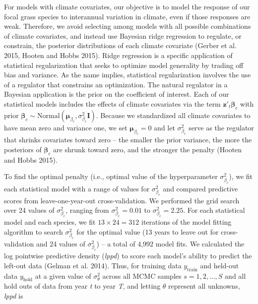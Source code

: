\documentclass[12pt,]{article}
\begin{document}
For models with climate covariates, our objective is to model the
response of our focal grass species to interannual variation in climate,
even if those responses are weak. Therefore, we avoid selecting among
models with all possible combinations of climate covariates, and instead
use Bayesian ridge regression to regulate, or constrain, the posterior
distributions of each climate covariate (Gerber et al. 2015, Hooten and
Hobbs 2015). Ridge regression is a specific application of statistical
regularization that seeks to optimize model generality by trading off
bias and variance. As the name implies, statistical regularization
involves the use of a regulator that constrains an optimization. The
natural regulator in a Bayesian application is the prior on the
coefficient of interest. Each of our statistical models includes the
effects of climate covariates via the term
\(\textbf{z}'_t \boldsymbol{\beta}_c\) with prior
\(\boldsymbol{\beta}_c \sim \text{Normal}(\boldsymbol{\mu}_{\beta_c}, \sigma_{\beta_c}^2\textbf{I})\).
Because we standardized all climate covariates to have mean zero and
variance one, we set \(\boldsymbol{\mu}_{\beta_c} = 0\) and let
\(\sigma_{\beta_c}^2\) serve as the regulator that shrinks covariates
toward zero -- the smaller the prior variance, the more the posteriors
of \(\boldsymbol{\beta}_c\) are shrunk toward zero, and the stronger the
penalty (Hooten and Hobbs 2015).

To find the optimal penalty (i.e., optimal value of the hyperparameter
\(\sigma_{\beta_c}^2\)), we fit each statistical model with a range of
values for \(\sigma_{\beta_c}^2\) and compared predictive scores from
leave-one-year-out cross-validation. We performed the grid search over
24 values of \(\sigma_{\beta_c}^2\), ranging from
\(\sigma_{\beta_c}^2 = 0.01\) to \(\sigma_{\beta_c}^2 = 2.25\). For each
statistical model and each species, we fit \(13\times24=312\) iterations
of the model fitting algorithm to search \(\sigma_{\beta_c}^2\) for the
optimal value (13 years to leave out for cross-validation and 24 values
of \(\sigma_{\beta_c}^2\)) -- a total of 4,992 model fits. We calculated
the log pointwise predictive density (\emph{lppd}) to score each model's
ability to predict the left-out data (Gelman et al. 2014). Thus, for
training data \(y_{\text{train}}\) and held-out data \(y_{\text{hold}}\)
at a given value of \(\sigma_\theta^2\) across all MCMC samples
\(s=1,2,...,S\) and all hold outs of data from year \emph{t} to year
\emph{T}, and letting \(\theta\) represent all unknowns, \emph{lppd} is
\end{document}
